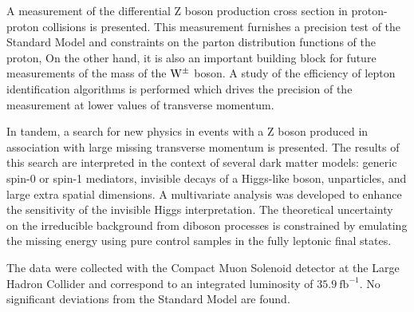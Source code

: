 % 
% 
%

A measurement of the differential Z boson production cross section in proton-proton collisions
is presented.
This measurement furnishes a precision test of the Standard Model and
constraints on the parton distribution functions of the proton,
On the other hand, it is also an important building block for
future measurements of the mass of the $\mathrm{W}^{\pm}$ boson.
A study of the efficiency of lepton identification algorithms is performed which
drives the precision of the measurement at lower values of transverse momentum.

In tandem, a search for new physics in events with a Z boson produced in association with
large missing transverse momentum is presented.
The results of this search are interpreted in the context of several dark matter models:
generic spin-0 or spin-1 mediators, invisible decays of a Higgs-like boson,
unparticles, and large extra spatial dimensions.
A multivariate analysis was developed to enhance the sensitivity of the invisible Higgs interpretation.
The theoretical uncertainty on the irreducible background from diboson processes is constrained by
emulating the missing energy using pure control samples in the fully leptonic final states.

The data were collected with the Compact Muon Solenoid detector at the Large Hadron Collider and correspond to an
integrated luminosity of $35.9~\mathrm{fb}^{-1}$. No significant deviations from the Standard Model are found.



